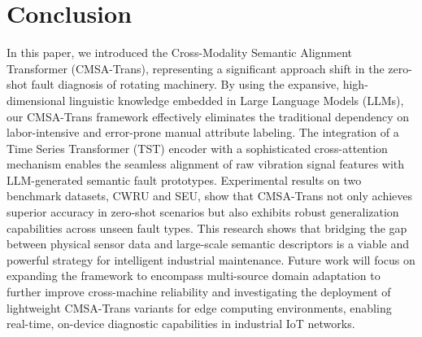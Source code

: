\documentclass[journal]{IEEEtran}
\begin{document}
\section{Conclusion}
In this paper, we introduced the Cross-Modality Semantic Alignment Transformer (CMSA-Trans), representing a significant approach shift in the zero-shot fault diagnosis of rotating machinery. By using the expansive, high-dimensional linguistic knowledge embedded in Large Language Models (LLMs), our CMSA-Trans framework effectively eliminates the traditional dependency on labor-intensive and error-prone manual attribute labeling. The integration of a Time Series Transformer (TST) encoder with a sophisticated cross-attention mechanism enables the seamless alignment of raw vibration signal features with LLM-generated semantic fault prototypes. Experimental results on two benchmark datasets, CWRU and SEU, show that CMSA-Trans not only achieves superior accuracy in zero-shot scenarios but also exhibits robust generalization capabilities across unseen fault types. This research shows that bridging the gap between physical sensor data and large-scale semantic descriptors is a viable and powerful strategy for intelligent industrial maintenance. Future work will focus on expanding the framework to encompass multi-source domain adaptation to further improve cross-machine reliability and investigating the deployment of lightweight CMSA-Trans variants for edge computing environments, enabling real-time, on-device diagnostic capabilities in industrial IoT networks.



\end{document}
